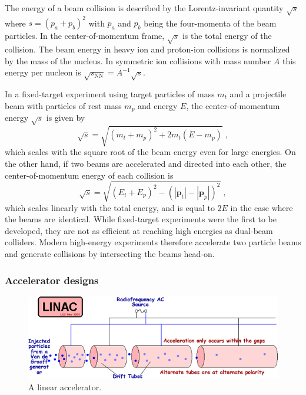 The energy of a beam collision is described by the Lorentz-invariant quantity $\sqrt{s}$ where $s = (p_a + p_b)^2$ with $p_a$ and $p_b$ being the four-momenta of the beam particles.
In the center-of-momentum frame, $\sqrt{s}$ is the total energy of the collision.
The beam energy in heavy ion and proton-ion collisions is normalized by the mass of the nucleus.
In symmetric ion collisions with mass number $A$ this energy per nucleon is $\sqrt{s_\mathrm{NN}} = A^{-1} \sqrt{s}$.

In a fixed-target experiment using target particles of mass $m_t$ and a projectile beam with particles of rest mass $m_p$ and energy $E$, the center-of-momentum energy $\sqrt{s}$ is given by
\begin{equation}
\sqrt{s} = \sqrt{(m_t+m_p)^2 + 2 m_t (E - m_p)} \; ,
\end{equation}
which scales with the square root of the beam energy even for large energies.
On the other hand, if two beams are accelerated and directed into each other, the center-of-momentum energy of each collision is
\begin{equation}
\sqrt{s} = \sqrt{(E_t + E_p)^2 - (|\mathbf{p}_t| - |\mathbf{p}_p|)^2} \; ,
\end{equation}
which scales linearly with the total energy, and is equal to $2E$ in the case where the beams are identical.
While fixed-target experiments were the first to be developed, they are not as efficient at reaching high energies as dual-beam colliders.
Modern high-energy experiments therefore accelerate two particle beams and generate collisions by intersecting the beams head-on.

\subsubsection{Accelerator designs}

\begin{figure}[t]
  \includegraphics{LINAC.png}
  \caption{A linear accelerator.}
  \label{fig:linac}
\end{figure}

